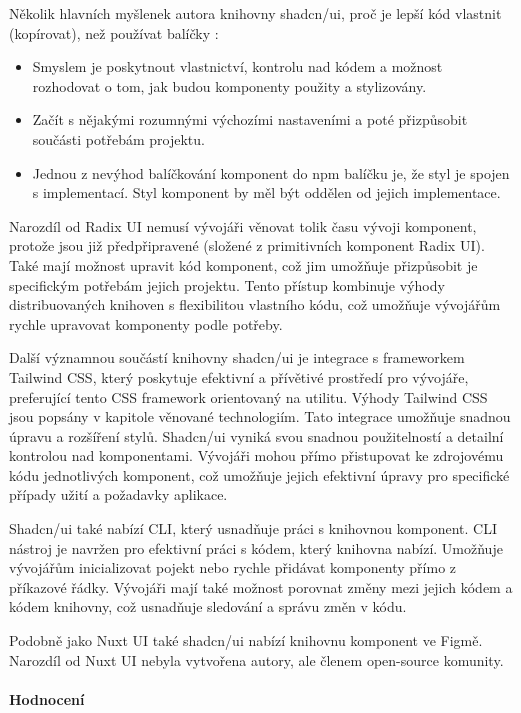 Několik hlavních myšlenek autora knihovny shadcn/ui, proč je lepší kód vlastnit (kopírovat), než používat balíčky \cite{ShadcnUI}:

\begin{itemize}
    \item Smyslem je poskytnout vlastnictví, kontrolu nad kódem a možnost rozhodovat o tom, jak budou komponenty použity a stylizovány.
    \item Začít s nějakými rozumnými výchozími nastaveními a poté přizpůsobit součásti potřebám projektu.
    \item Jednou z nevýhod balíčkování komponent do npm balíčku je, že styl je spojen s implementací. Styl komponent by měl být oddělen od jejich implementace.
\end{itemize}

Narozdíl od Radix UI nemusí vývojáři věnovat tolik času vývoji komponent, protože jsou již předpřipravené (složené z primitivních komponent Radix UI). Také mají možnost upravit kód komponent, což jim umožňuje přizpůsobit je specifickým potřebám jejich projektu. Tento přístup kombinuje výhody distribuovaných knihoven s flexibilitou vlastního kódu, což umožňuje vývojářům rychle upravovat komponenty podle potřeby.

Další významnou součástí knihovny shadcn/ui je integrace s frameworkem Tailwind CSS, který poskytuje efektivní a přívětivé prostředí pro vývojáře, preferující tento CSS framework orientovaný na utilitu. Výhody Tailwind CSS jsou popsány v kapitole věnované technologiím. Tato integrace umožňuje snadnou úpravu a rozšíření stylů. Shadcn/ui vyniká svou snadnou použitelností a detailní kontrolou nad komponentami. Vývojáři mohou přímo přistupovat ke zdrojovému kódu jednotlivých komponent, což umožňuje jejich efektivní úpravy pro specifické případy užití a požadavky aplikace.

Shadcn/ui také nabízí CLI, který usnadňuje práci s knihovnou komponent. CLI nástroj je navržen pro efektivní práci s kódem, který knihovna nabízí. Umožňuje vývojářům inicializovat pojekt nebo rychle přidávat komponenty přímo z příkazové řádky. Vývojáři mají také možnost porovnat změny mezi jejich kódem a kódem knihovny, což usnadňuje sledování a správu změn v kódu.

Podobně jako Nuxt UI také shadcn/ui nabízí knihovnu komponent ve Figmě. Narozdíl od Nuxt UI nebyla vytvořena autory, ale členem open-source komunity. \cite{ShadcnUIFigma}

\paragraph{Hodnocení}

